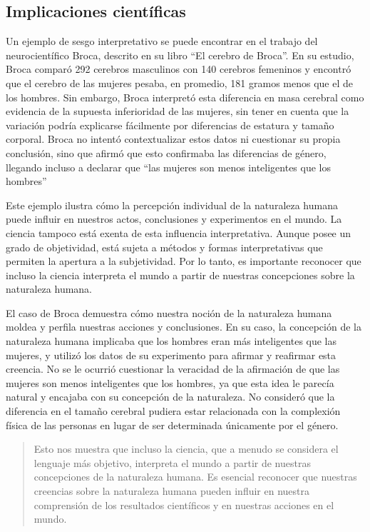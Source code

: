 \documentclass[
  letterpaper,
  DIV=11,
  numbers=noendperiod]{scrartcl}
\begin{document}
\hypertarget{implicaciones-cientuxedficas}{%
\subsection{Implicaciones
científicas}\label{implicaciones-cientuxedficas}}

Un ejemplo de sesgo interpretativo se puede encontrar en el trabajo del
neurocientífico Broca, descrito en su libro ``El cerebro de Broca''. En
su estudio, Broca comparó 292 cerebros masculinos con 140 cerebros
femeninos y encontró que el cerebro de las mujeres pesaba, en promedio,
181 gramos menos que el de los hombres. Sin embargo, Broca interpretó
esta diferencia en masa cerebral como evidencia de la supuesta
inferioridad de las mujeres, sin tener en cuenta que la variación podría
explicarse fácilmente por diferencias de estatura y tamaño corporal.
Broca no intentó contextualizar estos datos ni cuestionar su propia
conclusión, sino que afirmó que esto confirmaba las diferencias de
género, llegando incluso a declarar que ``las mujeres son menos
inteligentes que los hombres''

Este ejemplo ilustra cómo la percepción individual de la naturaleza
humana puede influir en nuestros actos, conclusiones y experimentos en
el mundo. La ciencia tampoco está exenta de esta influencia
interpretativa. Aunque posee un grado de objetividad, está sujeta a
métodos y formas interpretativas que permiten la apertura a la
subjetividad. Por lo tanto, es importante reconocer que incluso la
ciencia interpreta el mundo a partir de nuestras concepciones sobre la
naturaleza humana.

El caso de Broca demuestra cómo nuestra noción de la naturaleza humana
moldea y perfila nuestras acciones y conclusiones. En su caso, la
concepción de la naturaleza humana implicaba que los hombres eran más
inteligentes que las mujeres, y utilizó los datos de su experimento para
afirmar y reafirmar esta creencia. No se le ocurrió cuestionar la
veracidad de la afirmación de que las mujeres son menos inteligentes que
los hombres, ya que esta idea le parecía natural y encajaba con su
concepción de la naturaleza. No consideró que la diferencia en el tamaño
cerebral pudiera estar relacionada con la complexión física de las
personas en lugar de ser determinada únicamente por el género.

\begin{quote}
Esto nos muestra que incluso la ciencia, que a menudo se considera el
lenguaje más objetivo, interpreta el mundo a partir de nuestras
concepciones de la naturaleza humana. Es esencial reconocer que nuestras
creencias sobre la naturaleza humana pueden influir en nuestra
comprensión de los resultados científicos y en nuestras acciones en el
mundo.
\end{quote}
\end{document}
